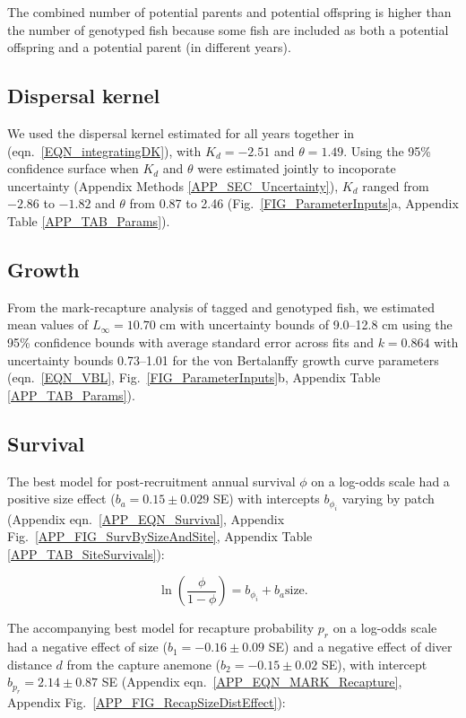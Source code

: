 \documentclass[12pt, oneside]{article}   	%
\begin{document}
The combined number of potential parents and potential offspring is higher than the number of genotyped fish because some fish are included as both a potential offspring and a potential parent (in different years).

\subsection{Dispersal kernel} \label{APP_SEC_RESULTS_Dispersal}

We used the dispersal kernel estimated for all years together in \cite{catalanoInPrepconnectivity} (eqn.\ \ref{EQN_integratingDK}), with $K_d = -2.51$ and $\theta = 1.49$. Using the 95\% confidence surface when $K_d$ and $\theta$ were estimated jointly to incoporate uncertainty (Appendix Methods \ref{APP_SEC_Uncertainty}), $K_d$ ranged from $-2.86$ to $-1.82$ and $\theta$ from 0.87 to 2.46 (Fig.\ \ref{FIG_ParameterInputs}a, Appendix Table \ref{APP_TAB_Params}).

\subsection{Growth} \label{APP_SEC_RESULTS_Growth}

From the mark-recapture analysis of tagged and genotyped fish, we estimated mean values of $L_\infty = 10.70$ cm with uncertainty bounds of 9.0--12.8 cm using the 95\% confidence bounds with average standard error across fits and $k = 0.864$ with uncertainty bounds 0.73--1.01 for the von Bertalanffy growth curve parameters (eqn.\ \ref{EQN_VBL}, Fig.\ \ref{FIG_ParameterInputs}b, Appendix Table \ref{APP_TAB_Params}). 

\subsection{Survival} \label{APP_SEC_RESULTS_Survival}

The best model for post-recruitment annual survival $\phi$ on a log-odds scale had a positive size effect ($b_a = 0.15 \pm 0.029$ SE) with intercepts $b_{\phi_i}$ varying by patch (Appendix eqn.\ \ref{APP_EQN_Survival}, Appendix Fig.\ \ref{APP_FIG_SurvBySizeAndSite}, Appendix Table \ref{APP_TAB_SiteSurvivals}):

\begin{equation}
\ln(\frac{\phi}{1-\phi}) = b_{\phi_i} + b_a\text{size}. \label{APP_EQN_Survival}
\end{equation}

The accompanying best model for recapture probability $p_r$ on a log-odds scale had a negative effect of size ($b_1 = -0.16 \pm 0.09$ SE) and a negative effect of diver distance $d$ from the capture anemone ($b_2 = -0.15 \pm 0.02$ SE), with intercept $b_{p_r} = 2.14 \pm 0.87$ SE (Appendix eqn.\ \ref{APP_EQN_MARK_Recapture}, Appendix Fig.\ \ref{APP_FIG_RecapSizeDistEffect}):
\end{document}
